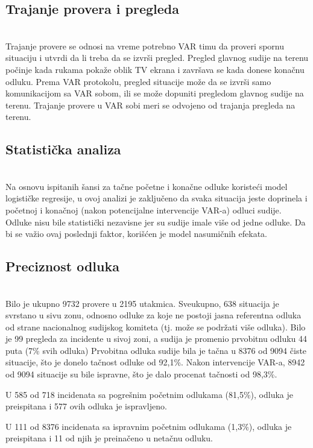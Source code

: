 \documentclass[a4paper]{article}
\begin{document}
\subsection{Trajanje provera i pregleda} \\
Trajanje provere se odnosi na vreme potrebno VAR timu da proveri spornu situaciju i utvrdi da li treba da se izvrši pregled. Pregled glavnog sudije na terenu počinje kada rukama pokaže oblik TV ekrana i završava se kada donese konačnu odluku. Prema VAR protokolu, pregled situacije može da se izvrši samo komunikacijom sa VAR sobom, ili se može dopuniti pregledom glavnog sudije na terenu. Trajanje provere u VAR sobi meri se odvojeno od trajanja pregleda na terenu.\\

 \subsection{Statistička analiza}\\

Na osnovu ispitanih šansi za tačne početne i konačne odluke koristeći model logističke regresije, u ovoj analizi je zaključeno da svaka situacija jeste doprinela i početnoj i konačnoj (nakon potencijalne intervencije VAR-a) odluci sudije. Odluke nisu bile statistički nezavisne jer su sudije imale više od jedne odluke. Da bi se važio ovaj poslednji faktor, korišćen je model nasumičnih efekata. \\


\subsection{Preciznost odluka} \\

Bilo je ukupno 9732 provere u 2195 utakmica. Sveukupno, 638 situacija je svrstano u sivu zonu, odnosno odluke za koje ne postoji jasna referentna odluka od strane nacionalnog sudijskog komiteta (tj. može se podržati više odluka). Bilo je 99 pregleda za incidente u sivoj zoni, a sudija je promenio prvobitnu odluku 44 puta (7\% svih odluka)
Prvobitna odluka sudije bila je tačna u 8376 od 9094 čiste situacije, što je donelo tačnost odluke od 92,1\%. Nakon intervencije VAR-a, 8942 od 9094 situacije su bile ispravne, što je dalo procenat tačnosti od 98,3\%.  

U 585 od 718 incidenata sa pogrešnim početnim odlukama (81,5\%), odluka je preispitana i 577 ovih odluka je ispravljeno. 

U 111 od 8376 incidenata sa ispravnim početnim odlukama (1,3\%), odluka je preispitana i 11 od njih je preinačeno u netačnu odluku. \\
\end{document}
